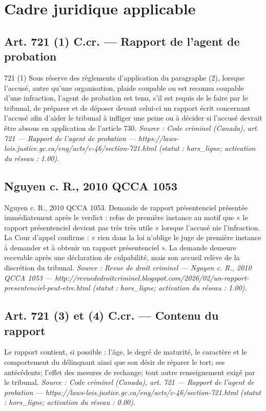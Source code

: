 \documentclass[12pt,a4paper]{article}
\begin{document}
\section{Cadre juridique applicable}
\subsection*{Art. 721 (1) C.cr. — Rapport de l'agent de probation}
721 (1) Sous réserve des règlements d'application du paragraphe (2), lorsque l'accusé, autre qu'une organisation, plaide coupable ou est reconnu coupable d'une infraction, l'agent de probation est tenu, s'il est requis de le faire par le tribunal, de préparer et de déposer devant celui-ci un rapport écrit concernant l'accusé afin d'aider le tribunal à infliger une peine ou à décider si l'accusé devrait être absous en application de l'article 730.
\emph{Source : Code criminel (Canada), art. 721 — Rapport de l'agent de probation — https://laws-lois.justice.gc.ca/eng/acts/c-46/section-721.html (statut : hors\_ligne; activation du réseau : 1.00).}

\subsection*{Nguyen c. R., 2010 QCCA 1053}
Nguyen c. R., 2010 QCCA 1053. Demande de rapport présentenciel présentée immédiatement après le verdict : refus de première instance au motif que « le rapport présentenciel devient pas très très utile » lorsque l'accusé nie l'infraction. La Cour d'appel confirme : « rien dans la loi n'oblige le juge de première instance à demander et à obtenir un rapport présentenciel ». La demande demeure recevable après une déclaration de culpabilité, mais son accueil relève de la discrétion du tribunal.
\emph{Source : Revue de droit criminel — Nguyen c. R., 2010 QCCA 1053 — http://revuededroitcriminel.blogspot.com/2026/02/un-rapport-presentenciel-peut-etre.html (statut : hors\_ligne; activation du réseau : 1.00).}

\subsection*{Art. 721 (3) et (4) C.cr. — Contenu du rapport}
Le rapport contient, si possible : l'âge, le degré de maturité, le caractère et le comportement du délinquant ainsi que son désir de réparer le tort; ses antécédents; l'effet des mesures de rechange; tout autre renseignement exigé par le tribunal.
\emph{Source : Code criminel (Canada), art. 721 — Rapport de l'agent de probation — https://laws-lois.justice.gc.ca/eng/acts/c-46/section-721.html (statut : hors\_ligne; activation du réseau : 0.00).}
\end{document}
